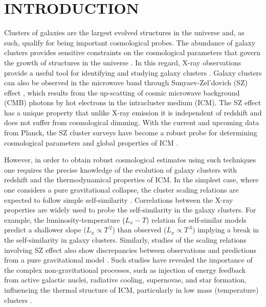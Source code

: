 \documentclass[a4paper,fleqn,usenatbib]{mnras}
\begin{document}
\section{INTRODUCTION}
Clusters of galaxies are the largest evolved structures in the universe and, as such,
qualify for being important cosmological probes. The abundance of galaxy clusters provides sensitive constraints on the cosmological parameters that govern the growth of structures in the universe \citep{0,1,2}. In this regard, X-ray observations provide a useful tool for identifying 
and studying galaxy clusters \citep{13,10,Eckert2013a,Eckert2013b}. Galaxy clusters can also be observed in the microwave band through Sunyaev-Zel'dovich (SZ) effect \citep{Sunyaev1972,Sunyaev1980}, which results from the up-scatting of cosmic microwave background (CMB) photons by hot electrons in the intracluster
medium (ICM). The SZ effect has a unique property that unlike X-ray emission it is independent of redshift and does not suffer from cosmological dimming. With the current and upcoming data 
from Planck, the SZ cluster surveys have  become a robust probe for determining cosmological parameters and global properties of ICM \citep{Planck2013a,Planck2014,Eckert2013a,McCarthy2014,Ettori2015}.

However, in order to obtain robust cosmological estimates using such techniques one requires the precise knowledge of the evolution of galaxy clusters with redshift and the thermodynamical properties of ICM. 
In the simplest case, where one considers a pure gravitational collapse, the cluster scaling relations are expected to follow simple self-similarity \citep{Kaiser1986}. 
Correlations between the X-ray properties are widely used to probe the self-similarity in the galaxy clusters.
For example, the luminosity-temperature ($L_x-T$) relation for self-similar models predict a
shallower slope ($L_x\propto T^{~2}$) than observed ($L_x\propto T^{~3}$) \citep{Edge1991,Markevitch1998}  implying a break in the self-similarity in galaxy clusters. 
Similarly, studies of the scaling relations involving SZ effect also show discrepancies between observations and predictions from a pure gravitational model \citep{Holderb2001,Battaglia2012}. 
Such studies have revealed the importance of the  complex non-gravitational processes, such as injection of energy feedback from active galactic nuclei, radiative cooling, supernovae, and star formation, influencing the thermal structure of ICM, particularly in low mass (temperature) clusters \citep{Voit2005,Roychowdhury2005,Chaudhuri2012,Chaudhuri2013}.
\end{document}
